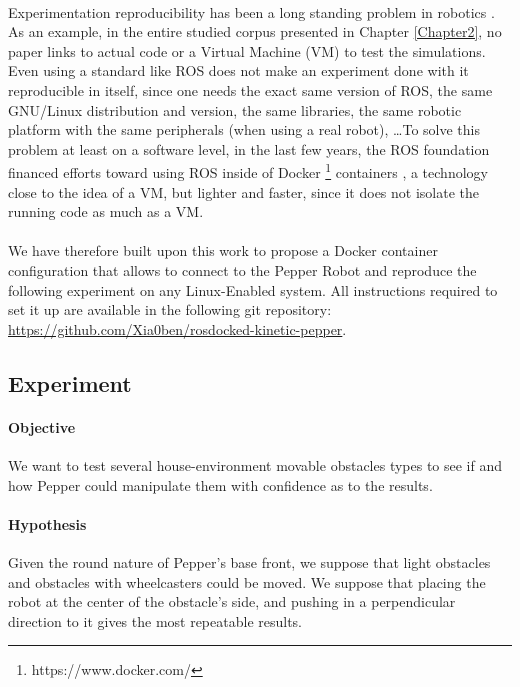 \paragraph{} Experimentation reproducibility has been a long standing problem in robotics \parencite{guglielmelli_research_2015, bonsignorio_toward_2015}. As an example, in the entire studied corpus presented in Chapter \ref{Chapter2}, no paper links to actual code or a Virtual Machine (VM) to test the simulations. Even using a standard like ROS does not make an experiment done with it reproducible in itself, since one needs the exact same version of ROS, the same GNU/Linux distribution and version, the same libraries, the same robotic platform with the same peripherals (when using a real robot), \dots To solve this problem at least on a software level, in the last few years, the ROS foundation financed efforts toward using ROS inside of Docker \footnote{https://www.docker.com/} containers \parencite{white_ros_2017}, a technology close to the idea of a VM, but lighter and faster, since it does not isolate the running code as much as a VM.

\paragraph{} We have therefore built upon this work to propose a Docker container configuration that allows to connect to the Pepper Robot and reproduce the following experiment on any Linux-Enabled system. All instructions required to set it up are available in the following git repository: \\ \url{https://github.com/Xia0ben/rosdocked-kinetic-pepper}.

\subsection{Experiment}

\paragraph{Objective} We want to test several house-environment movable obstacles types to see if and how Pepper could manipulate them with confidence as to the results.

\paragraph{Hypothesis} Given the round nature of Pepper's base front, we suppose that light obstacles and obstacles with wheelcasters could be moved. We suppose that placing the robot at the center of the obstacle's side, and pushing in a perpendicular direction to it gives the most repeatable results.

